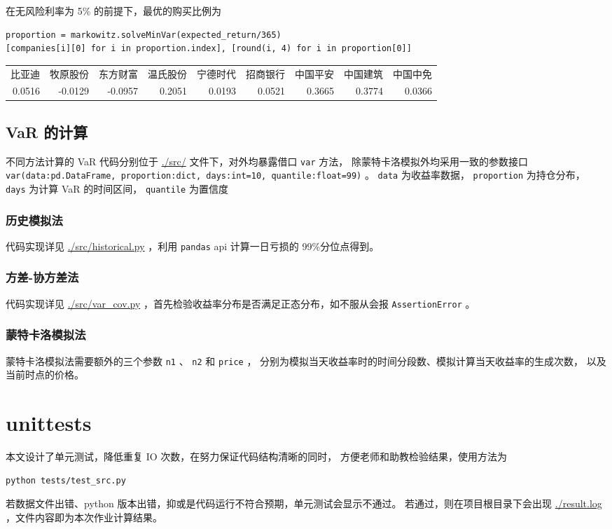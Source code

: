 \documentclass[a4paper,12pt]{ctexart}
\begin{document}
在无风险利率为 5\% 的前提下，最优的购买比例为
\begin{verbatim}
proportion = markowitz.solveMinVar(expected_return/365)
[companies[i][0] for i in proportion.index], [round(i, 4) for i in proportion[0]]
\end{verbatim}

\begin{center}
\begin{tabular}{rrrrrrrrr}
比亚迪 & 牧原股份 & 东方财富 & 温氏股份 & 宁德时代 & 招商银行 & 中国平安 & 中国建筑 & 中国中免\\
0.0516 & -0.0129 & -0.0957 & 0.2051 & 0.0193 & 0.0521 & 0.3665 & 0.3774 & 0.0366\\
\end{tabular}
\end{center}

\subsection{VaR 的计算}
\label{sec:org10d3c74}
不同方法计算的 VaR 代码分别位于 \url{./src/} 文件下，对外均暴露借口 \texttt{var} 方法，
除蒙特卡洛模拟外均采用一致的参数接口
\texttt{var(data:pd.DataFrame, proportion:dict, days:int=10, quantile:float=99)} 。
\texttt{data} 为收益率数据， \texttt{proportion} 为持仓分布， \texttt{days} 为计算 VaR 的时间区间， \texttt{quantile} 为置信度
\subsubsection{历史模拟法}
\label{sec:org9ea8ef2}
代码实现详见 \url{./src/historical.py} ，利用 \texttt{pandas} api 计算一日亏损的 99\%分位点得到。
\subsubsection{方差-协方差法}
\label{sec:org52abd2b}
代码实现详见 \url{./src/var\_cov.py} ，首先检验收益率分布是否满足正态分布，如不服从会报 \texttt{AssertionError} 。
\subsubsection{蒙特卡洛模拟法}
\label{sec:orgd21aea7}
蒙特卡洛模拟法需要额外的三个参数 \texttt{n1} 、 \texttt{n2} 和 \texttt{price} ，
分别为模拟当天收益率时的时间分段数、模拟计算当天收益率的生成次数，
以及当前时点的价格。
\section{unittests}
\label{sec:org22fa7a8}
本文设计了单元测试，降低重复 IO 次数，在努力保证代码结构清晰的同时，
方便老师和助教检验结果，使用方法为
\begin{verbatim}
python tests/test_src.py
\end{verbatim}

若数据文件出错、python 版本出错，抑或是代码运行不符合预期，单元测试会显示不通过。
若通过，则在项目根目录下会出现 \url{./result.log} ，文件内容即为本次作业计算结果。
\end{document}
